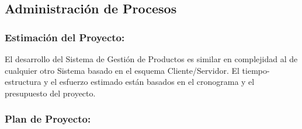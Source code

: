 \documentclass[a4paper,11pt, spanish]{report}
\begin{document}
{{{{{{{{    \subsection{Administración de Procesos}
        \subsubsection{Estimación del Proyecto:}
            El desarrollo del Sistema de Gestión de Productos es similar en complejidad al de cualquier otro Sistema basado en el esquema Cliente/Servidor. El tiempo-estructura y el esfuerzo estimado están basados en el cronograma y el presupuesto del proyecto.
        \subsubsection{Plan de Proyecto:}
            
}}}}}}}}
\end{document}
